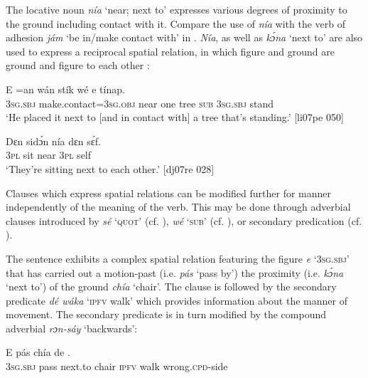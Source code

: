 The locative noun \textit{nía} ‘near; next to’ expresses various degrees of proximity to the ground including contact with it. Compare the use of \textit{nía} with the verb of adhesion \textit{jám} ‘be in/make contact with’ in . \textit{Nía}, as well as \textit{kɔ́na} ‘next to’ are also used to express a reciprocal spatial relation, in which figure and ground are ground and figure to each other :\index{} 


\ea%
    \label{ex:key:992}
    \gll E    =an            wán    stík  wé  e    tínap.\\
\textsc{3sg.sbj}  make.contact=\textsc{3sg.obj}  near    one    tree  \textsc{sub}  \textsc{3sg.sbj}  stand\\

\glt ‘He placed it next to [and in contact with] a tree that’s standing.’ [li07pe 050]
\z


\ea%
    \label{ex:key:993}
    \gll Dɛn  sidɔ́n  nía    dɛn  sɛ́f.\\
\textsc{3pl}  sit    near    \textsc{3pl}  self\\

\glt ‘They’re sitting next to each other.’ [dj07re 028]
\z

Clauses which express spatial relations can be modified further for manner independently of the meaning of the verb. This may be done through adverbial clauses introduced by \textit{sé} ‘\textsc{quot}’ (cf. ), \textit{wé} ‘\textsc{sub}’ (cf. ), or secondary predication (cf. ).


The sentence  exhibits a complex spatial relation featuring the figure \textit{e} ‘\textsc{3sg.sbj}’ that has carried out a motion-past (i.e. \textit{pás} ‘pass by’) the proximity (i.e. \textit{kɔ́na} ‘next to’) of the ground \textit{chía} ‘chair’. The clause is followed by the secondary predicate \textit{dé wáka} ‘\textsc{ipfv} walk’ which provides information about the\is{} manner of movement. The secondary predicate is in turn modified by the compound adverbial \textit{rɔn-sáy} ‘backwards’:



\ea%
    \label{ex:key:994}
    \gll E    pás  chía de   .\\
\textsc{3sg.sbj}  pass    next.to  chair  \textsc{ipfv}  walk  wrong.\textsc{cpd}{}-side\\

